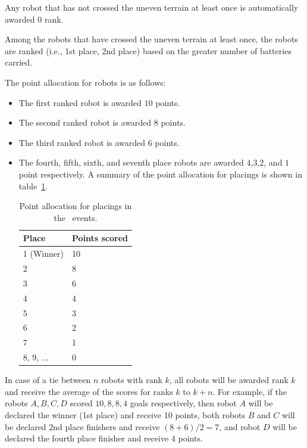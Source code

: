 \documentclass[12pt]{hurocup}
\begin{document}

\begin{lawlist}[LC]
\item Any robot that has not crossed the uneven terrain at least once is
  automatically awarded $0$ rank.
\item Among the robots that have crossed the uneven terrain at least
  once, the robots are ranked (i.e., 1st place, 2nd place) based on
  the greater number of batteries carried.

\item The point allocation for robots is as follows:
  \begin{itemize}
  \item The first ranked robot is awarded $10$ points.
  \item The second ranked robot is awarded $8$ points.
  \item The third ranked robot is awarded $6$ points.
  \item The fourth, fifth, sixth, and seventh place robots are awarded
    $4$,$3$,$2$, and $1$ point respectively.  A summary of the point
    allocation for placings is shown in table~\ref{point-allocation}.

    \begin{table}
      \begin{center}
        \begin{tabular}{l|l}
          \hline
          Place & Points scored \\
          \hline
          1 (Winner) & 10 \\
          2          & 8 \\
          3          & 6 \\
          4          & 4 \\
          5          & 3 \\
          6          & 2 \\
          7          & 1 \\
          8, 9, ...  & 0 \\
          \hline
        \end{tabular}
      \end{center}
      \caption{Point allocation for placings in the \HuroCup\ events.}
      \label{point-allocation}
    \end{table}
  \end{itemize}

\item In case of a tie between $n$ robots with rank $k$, all robots
 will be awarded rank $k$ and receive the average of the scores for
 ranks $k$ to $k+n$.  For example, if the robots $A,B,C,D$ scored $10,
 8, 8, 4$ goals respectively, then robot $A$ will be declared the
 winner (1st place) and receive 10 points, both robots $B$ and $C$
 will be declared 2nd place finishers and receive $(8+6)/2=7$, and
 robot $D$ will be declared the fourth place finisher and receive $4$
 points.

\end{lawlist}
\end{document}
